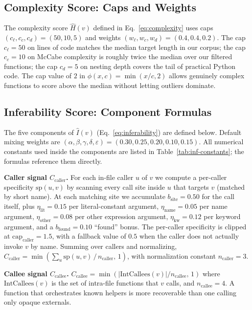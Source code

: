 \subsection{Complexity Score: Caps and Weights}
\label{app:algo:hyperparams}

The complexity score $\hat{H}(v)$ defined in Eq.~\eqref{eq:complexity}
uses caps $(c_{\ell}, c_{c}, c_{d}) = (50, 10, 5)$ and weights
$(w_{\ell}, w_{c}, w_{d}) = (0.4, 0.4, 0.2)$. The cap $c_{\ell}=50$
on lines of code matches the median target length in our corpus; the
cap $c_c=10$ on McCabe complexity is roughly twice the median over our
filtered functions; the cap $c_d=5$ on nesting depth covers the tail of
practical Python code. The cap value of $2$ in $\phi(x,c)=\min(x/c,2)$
allows genuinely complex functions to score above the median without
letting outliers dominate.

\subsection{Inferability Score: Component Formulas}
\label{app:algo:inferability}

The five components of $\hat{I}(v)$ (Eq.~\ref{eq:inferability}) are
defined below. Default mixing weights are
$(\alpha,\beta,\gamma,\delta,\varepsilon) = (0.30, 0.25, 0.20, 0.10, 0.15)$.
All numerical constants used inside the components are listed in
Table~\ref{tab:inf-constants}; the formulas reference them directly.

\textbf{Caller signal $C_{\mathrm{caller}}$.}
For each in-file caller $u$ of $v$ we compute a per-caller specificity
$\mathrm{sp}(u,v)$ by scanning every call site inside $u$ that targets
$v$ (matched by short name). At each matching site we accumulate
$b_{\mathrm{site}}=0.50$ for the call itself, plus
$\eta_{\mathrm{lit}}=0.15$ per literal-constant argument,
$\eta_{\mathrm{name}}=0.05$ per name argument,
$\eta_{\mathrm{other}}=0.08$ per other expression argument,
$\eta_{\mathrm{kw}}=0.12$ per keyword argument, and a
$b_{\mathrm{found}}=0.10$ ``found'' bonus. The per-caller specificity is
clipped at $\mathrm{cap}_{\mathrm{caller}}=1.5$, with a fallback value
of $0.5$ when the caller does not actually invoke $v$ by name. Summing
over callers and normalizing,
$C_{\mathrm{caller}} = \min\!\left(\sum_u \mathrm{sp}(u,v) \,/\, n_{\mathrm{caller}},\, 1\right)$,
with normalization constant $n_{\mathrm{caller}}=3$.

\textbf{Callee signal $C_{\mathrm{callee}}$.}
$C_{\mathrm{callee}} = \min(|\mathrm{IntCallees}(v)|/n_{\mathrm{callee}},\,1)$
where $\mathrm{IntCallees}(v)$ is the set of intra-file functions that
$v$ calls, and $n_{\mathrm{callee}}=4$. A function that orchestrates
known helpers is more recoverable than one calling only opaque externals.

